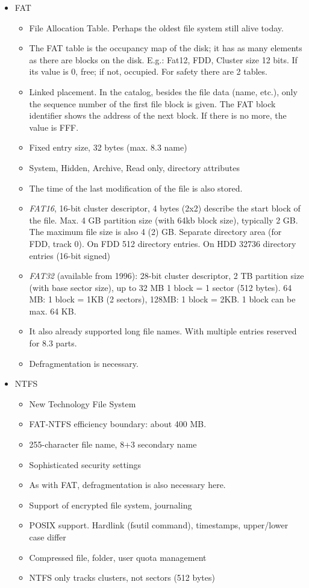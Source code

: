 \documentclass[margin=0px]{article}
\begin{document}
\begin{itemize}
    \item FAT
          \begin{itemize}
              \item File Allocation Table. Perhaps the oldest file system still alive today.
              \item The FAT table is the occupancy map of the disk; it has as many elements as there are blocks on the disk. E.g.: Fat12, FDD, Cluster size 12 bits. If its value is 0, free; if not, occupied. For safety there are 2 tables.
              \item Linked placement. In the catalog, besides the file data (name, etc.), only the sequence number of the first file block is given. The FAT block identifier shows the address of the next block. If there is no more, the value is FFF.
              \item Fixed entry size, 32 bytes (max. 8.3 name)
              \item System, Hidden, Archive, Read only, directory attributes
              \item The time of the last modification of the file is also stored.
              \item \textit{FAT16}, 16-bit cluster descriptor, 4 bytes (2x2) describe the start block of the file. Max. 4 GB partition size (with 64kb block size), typically 2 GB. The maximum file size is also 4 (2) GB. Separate directory area (for FDD, track 0). On FDD 512 directory entries. On HDD 32736 directory entries (16-bit signed)
              \item \textit{FAT32} (available from 1996): 28-bit cluster descriptor, 2 TB partition size (with base sector size), up to 32 MB 1 block = 1 sector (512 bytes). 64 MB: 1 block = 1KB (2 sectors), 128MB: 1 block = 2KB. 1 block can be max. 64 KB.
              \item It also already supported long file names. With multiple entries reserved for 8.3 parts.
              \item Defragmentation is necessary.
          \end{itemize}
    \item NTFS
          \begin{itemize}
              \item New Technology File System
              \item FAT-NTFS efficiency boundary: about 400 MB.
              \item 255-character file name, 8+3 secondary name
              \item Sophisticated security settings
              \item As with FAT, defragmentation is also necessary here.
              \item Support of encrypted file system, journaling
              \item POSIX support. Hardlink (fsutil command), timestamps, upper/lower case differ
              \item Compressed file, folder, user quota management
              \item NTFS only tracks clusters, not sectors (512 bytes)


\end{itemize}
\end{itemize}
\end{document}
